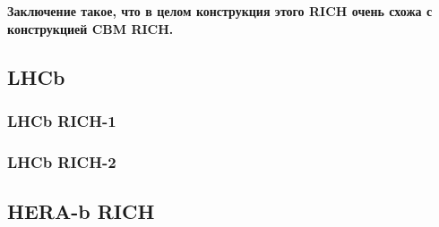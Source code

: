 \textbf{Заключение такое, что в целом конструкция этого RICH очень схожа с конструкцией CBM RICH.}


\subsection{LHCb}\label{sec:LHCb}

\subsubsection{LHCb RICH-1}\label{sec:LhcbRich1}

\subsubsection{LHCb RICH-2}\label{sec:LhcbRich2}

\subsection{HERA-b RICH}\label{sec:HerabRich}
